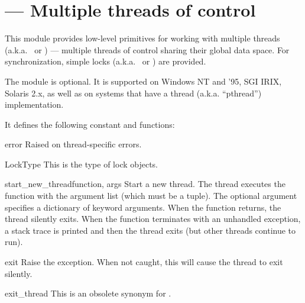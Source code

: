 \section{ ---
         Multiple threads of control}



This module provides low-level primitives for working with multiple
threads (a.k.a.\  or ) --- multiple
threads of control sharing their global data space.  For
synchronization, simple locks (a.k.a.\  or ) are provided.

The module is optional.  It is supported on Windows NT and '95, SGI
IRIX, Solaris 2.x, as well as on systems that have a \POSIX{} thread
(a.k.a. ``pthread'') implementation.

It defines the following constant and functions:

\begin{excdesc}{error}
Raised on thread-specific errors.
\end{excdesc}

\begin{datadesc}{LockType}
This is the type of lock objects.
\end{datadesc}

\begin{funcdesc}{start_new_thread}{function, args}
Start a new thread.  The thread executes the function 
with the argument list  (which must be a tuple).  The
optional  argument specifies a dictionary of keyword
arguments.  When the
function returns, the thread silently exits.  When the function
terminates with an unhandled exception, a stack trace is printed and
then the thread exits (but other threads continue to run).
\end{funcdesc}

\begin{funcdesc}{exit}{}
Raise the  exception.  When not caught, this
will cause the thread to exit silently.
\end{funcdesc}

\begin{funcdesc}{exit_thread}{}
This is an obsolete synonym for .
\end{funcdesc}

